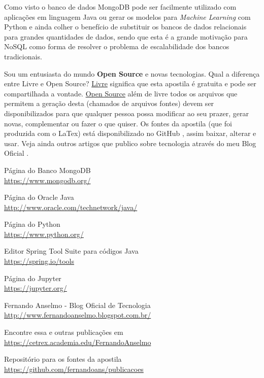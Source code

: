 \documentclass[a4paper,11pt]{article}
\begin{document}
Como visto o banco de dados MongoDB pode ser facilmente utilizado com aplicações em linguagem Java ou gerar os modelos para \textit{Machine Learning} com Python e ainda colher o benefício de substituir os bancos de dados relacionais para grandes quantidades de dados, sendo que esta é a grande motivação para NoSQL como forma de resolver o problema de escalabilidade dos bancos tradicionais.

Sou um entusiasta do mundo \textbf{Open Source} e novas tecnologias. Qual a diferença entre Livre e Open Source? \underline{Livre} significa que esta apostila é gratuita e pode ser compartilhada a vontade. \underline{Open Source} além de livre todos os arquivos que permitem a geração desta (chamados de arquivos fontes) devem ser disponibilizados para que qualquer pessoa possa modificar ao seu prazer, gerar novas, complementar ou fazer o que quiser. Os fontes da apostila (que foi produzida com o LaTex) está disponibilizado no GitHub \cite{github}, assim baixar, alterar e usar. Veja ainda outros artigos que publico sobre tecnologia através do meu Blog Oficial \cite{fernandoanselmo}.

\begin{thebibliography}{8}
  Página do Banco MongoDB \\
  \url{https://www.mongodb.org/}

  Página do Oracle Java \\
  \url{http://www.oracle.com/technetwork/java/}
  
  Página do Python \\
  \url{https://www.python.org/}

  Editor Spring Tool Suite para códigos Java \\
  \url{https://spring.io/tools}

  Página do Jupyter \\
  \url{https://jupyter.org/}

  Fernando Anselmo - Blog Oficial de Tecnologia \\
  \url{http://www.fernandoanselmo.blogspot.com.br/}

  Encontre essa e outras publicações em \\
  \url{https://cetrex.academia.edu/FernandoAnselmo}

  Repositório para os fontes da apostila \\
  \url{https://github.com/fernandoans/publicacoes}
\end{thebibliography}
  
\end{document}
